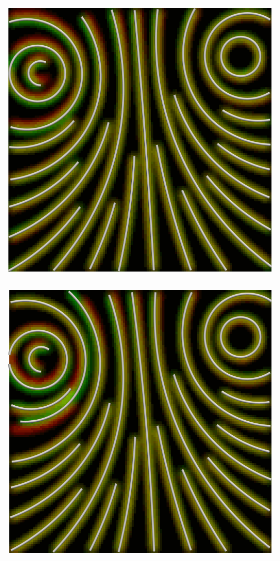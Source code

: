 \begin{figure}[ht]
\begin{subfigure}{\textwidth}
\begin{subfigure}{.19\textwidth}
        \end{subfigure}
        \begin{subfigure}{.19\textwidth}
            \centering
            \includegraphics[scale=.055]{figures/AlphaStudy/Gyro33C.0003.png}
        \end{subfigure}
        \begin{subfigure}{.19\textwidth}
            \centering
            \includegraphics[scale=.055]{figures/AlphaStudy/Gyro33C.0004.png}

\end{subfigure}
\end{subfigure}
\end{figure}
